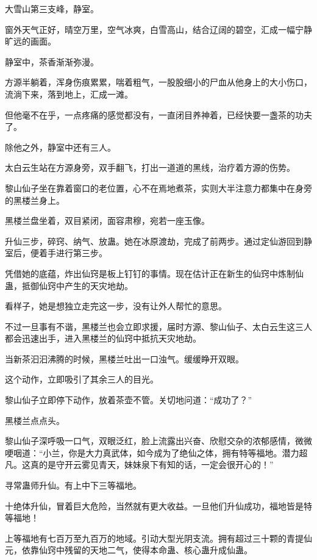 
\begin{this_body}

大雪山第三支峰，静室。

窗外天气正好，晴空万里，空气冰爽，白雪高山，结合辽阔的碧空，汇成一幅宁静旷远的画面。

静室中，茶香渐渐弥漫。

方源半躺着，浑身伤痕累累，喘着粗气，一股股细小的尸血从他身上的大小伤口，流淌下来，落到地上，汇成一滩。

但他毫不在乎，一点疼痛的感觉都没有，一直闭目养神着，已经快要一盏茶的功夫了。

除他之外，静室中还有三人。

太白云生站在方源身旁，双手翻飞，打出一道道的黑线，治疗着方源的伤势。

黎山仙子坐在靠着窗口的老位置，心不在焉地煮茶，实则大半注意力都集中在身旁的黑楼兰身上。

黑楼兰盘坐着，双目紧闭，面容肃穆，宛若一座玉像。

升仙三步，碎窍、纳气、放蛊。她在冰原渡劫，完成了前两步。通过定仙游回到静室后，便着手进行第三步。

凭借她的底蕴，炸出仙窍是板上钉钉的事情。现在估计正在新生的仙窍中炼制仙蛊，抵御仙窍中产生的天灾地劫。

看样子，她是想独立走完这一步，没有让外人帮忙的意思。

不过一旦事有不谐，黑楼兰也会立即求援，届时方源、黎山仙子、太白云生这三人都会迅速出手，进入黑楼兰的仙窍中抵抗天灾地劫。

当新茶汩汩沸腾的时候，黑楼兰吐出一口浊气。缓缓睁开双眼。

这个动作，立即吸引了其余三人的目光。

黎山仙子立即停下动作，放着茶壶不管。关切地问道：“成功了？”

黑楼兰点点头。

黎山仙子深呼吸一口气，双眼泛红，脸上流露出兴奋、欣慰交杂的浓郁感情，微微哽咽道：“小兰，你是大力真武体，如今成为了绝仙之体，拥有特等福地。潜力超凡。这真的是守开云雾见青天，妹妹泉下有知的话，一定会很开心的！”

寻常蛊师升仙。有上中下三等福地。

十绝体升仙，冒着巨大危险，当然就有更大收益。一旦他们升仙成功，福地皆是特等福地！

上等福地有七百万至九百万的地域。引动大型光阴支流。拥有超过三十颗的青提仙元，依靠仙窍中残留的天地二气，使得本命蛊、核心蛊升成仙蛊。


\end{this_body}
